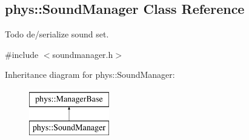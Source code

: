 \hypertarget{classphys_1_1SoundManager}{
\subsection{phys::SoundManager Class Reference}
\label{classphys_1_1SoundManager}
}


Todo de/serialize sound set.  




{\ttfamily \#include $<$soundmanager.h$>$}

Inheritance diagram for phys::SoundManager:\begin{figure}[H]
\begin{center}
\leavevmode
\includegraphics[height=2.000000cm]{classphys_1_1SoundManager}
\end{center}
\end{figure}
